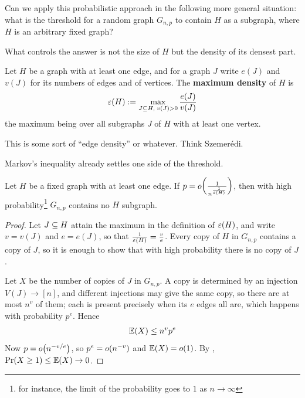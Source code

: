 Can we apply this probabilistic approach in the following more general situation: what is the threshold for a random graph $G_{n, p}$ to contain $H$ as a subgraph, where $H$ is an arbitrary fixed graph?

What controls the answer is not the size of $H$ but the density of its densest part.

\begin{boxdefinition}
    Let $H$ be a graph with at least one edge, and for a graph $J$ write $e(J)$ and $v(J)$ for its numbers of edges and of vertices. The \textbf{maximum density} of $H$ is
    \begin{align*}
        \varepsilon(H) := \max_{J \subseteq H, \; v(J) > 0} \frac{e(J)}{v(J)}
    \end{align*}
    the maximum being over all subgraphs $J$ of $H$ with at least one vertex.
\end{boxdefinition}

This is some sort of ``edge density'' or whatever. Think Szemer\'{e}di.

Markov's inequality already settles one side of the threshold.

\begin{boxtheorem} \label{Ch4:Thm:Subgraph_Threshold}
    Let $H$ be a fixed graph with at least one edge. If $p = o\!\left( \frac{1}{n^{\frac{1}{\varepsilon(H)}}} \right)$, then with high probability\footnote{for instance, the limit of the probability goes to $1$ as $n \to \infty$} $G_{n, p}$ contains no $H$ subgraph.
\end{boxtheorem}
\begin{proof}
    Let $J \subseteq H$ attain the maximum in the definition of $\varepsilon(H)$, and write $v = v(J)$ and $e = e(J)$, so that $\frac{1}{\varepsilon(H)} = \frac{v}{e}$. Every copy of $H$ in $G_{n, p}$ contains a copy of $J$, so it is enough to show that with high probability there is no copy of $J$.

    Let $X$ be the number of copies of $J$ in $G_{n, p}$. A copy is determined by an injection $V(J) \to [n]$, and different injections may give the same copy, so there are at most $n^{v}$ of them; each is present precisely when its $e$ edges all are, which happens with probability $p^{e}$. Hence
    \begin{align*}
        \mathbb{E}(X) \leq n^{v} p^{e}
    \end{align*}
    Now $p = o\!\left( n^{-v/e} \right)$, so $p^{e} = o\!\left( n^{-v} \right)$ and $\mathbb{E}(X) = o(1)$. By , $\Pr\!\left( X \geq 1 \right) \leq \mathbb{E}(X) \to 0$.
\end{proof}

